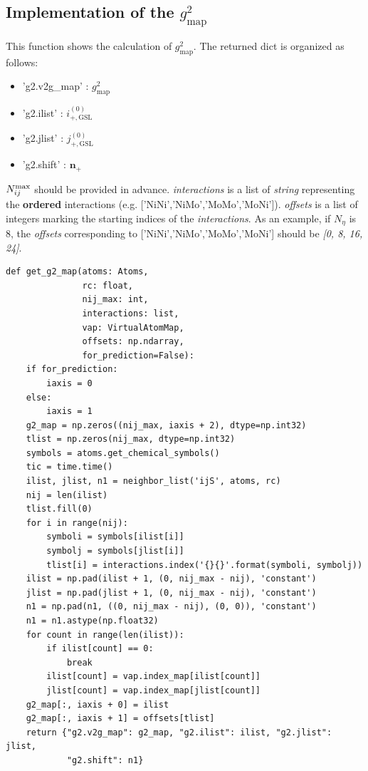 \documentclass[preprint]{revtex4-2}
\begin{document}
% 
%
\subsection{Implementation of the \texorpdfstring{$g^2_{\mathrm{map}}$}{g2map}}

This function shows the calculation of $g^2_{\mathrm{map}}$. The returned dict 
is organized as follows: 
\begin{itemize}
    \item \textmd{'g2.v2g\_map'} : $g^2_{\mathrm{map}}$
    \item \textmd{'g2.ilist'} : $i^{(0)}_{\mathrm{+,GSL}}$
    \item \textmd{'g2.jlist'} : $j^{(0)}_{\mathrm{+,GSL}}$
    \item \textmd{'g2.shift'} : $\mathbf{n_+}$
\end{itemize}
$N_{ij}^{\mathrm{max}}$ should be provided in advance. \textit{interactions} is a list of 
\textit{string} representing the \textbf{ordered} interactions (e.g. 
\textmd{['NiNi','NiMo','MoMo','MoNi']}). \textit{offsets} is a list of integers 
marking the starting indices of the \textit{interactions}. As an example, if 
$N_{\eta}$ is 8, the \textit{offsets} corresponding to 
\textmd{['NiNi','NiMo','MoMo','MoNi']} should be \textit{[0, 8, 16, 24]}.

\begin{verbatim}
def get_g2_map(atoms: Atoms,
               rc: float,
               nij_max: int,
               interactions: list,
               vap: VirtualAtomMap,
               offsets: np.ndarray,
               for_prediction=False):
    if for_prediction:
        iaxis = 0
    else:
        iaxis = 1
    g2_map = np.zeros((nij_max, iaxis + 2), dtype=np.int32)
    tlist = np.zeros(nij_max, dtype=np.int32)
    symbols = atoms.get_chemical_symbols()
    tic = time.time()
    ilist, jlist, n1 = neighbor_list('ijS', atoms, rc)
    nij = len(ilist)
    tlist.fill(0)
    for i in range(nij):
        symboli = symbols[ilist[i]]
        symbolj = symbols[jlist[i]]
        tlist[i] = interactions.index('{}{}'.format(symboli, symbolj))
    ilist = np.pad(ilist + 1, (0, nij_max - nij), 'constant')
    jlist = np.pad(jlist + 1, (0, nij_max - nij), 'constant')
    n1 = np.pad(n1, ((0, nij_max - nij), (0, 0)), 'constant')
    n1 = n1.astype(np.float32)
    for count in range(len(ilist)):
        if ilist[count] == 0:
            break
        ilist[count] = vap.index_map[ilist[count]]
        jlist[count] = vap.index_map[jlist[count]]
    g2_map[:, iaxis + 0] = ilist
    g2_map[:, iaxis + 1] = offsets[tlist]
    return {"g2.v2g_map": g2_map, "g2.ilist": ilist, "g2.jlist": jlist,
            "g2.shift": n1}
\end{verbatim}
\end{document}
